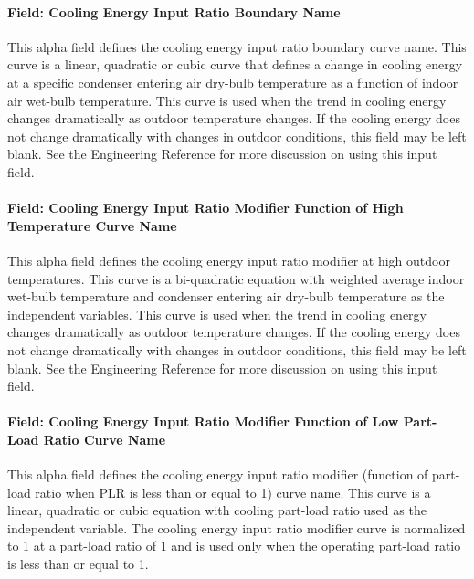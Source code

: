 \paragraph{Field: Cooling Energy Input Ratio Boundary Name}\label{field-cooling-energy-input-ratio-boundary-name}

This alpha field defines the cooling energy input ratio boundary curve name. This curve is a linear, quadratic or cubic curve that defines a change in cooling energy at a specific condenser entering air dry-bulb temperature as a function of indoor air wet-bulb temperature. This curve is used when the trend in cooling energy changes dramatically as outdoor temperature changes. If the cooling energy does not change dramatically with changes in outdoor conditions, this field may be left blank. See the Engineering Reference for more discussion on using this input field.

\paragraph{Field: Cooling Energy Input Ratio Modifier Function of High Temperature Curve Name}\label{field-cooling-energy-input-ratio-modifier-function-of-high-temperature-curve-name}

This alpha field defines the cooling energy input ratio modifier at high outdoor temperatures. This curve is a bi-quadratic equation with weighted average indoor wet-bulb temperature and condenser entering air dry-bulb temperature as the independent variables. This curve is used when the trend in cooling energy changes dramatically as outdoor temperature changes. If the cooling energy does not change dramatically with changes in outdoor conditions, this field may be left blank. See the Engineering Reference for more discussion on using this input field.

\paragraph{Field: Cooling Energy Input Ratio Modifier Function of Low Part-Load Ratio Curve Name}\label{field-cooling-energy-input-ratio-modifier-function-of-low-part-load-ratio-curve-name}

This alpha field defines the cooling energy input ratio modifier (function of part-load ratio when PLR is less than or equal to 1) curve name. This curve is a linear, quadratic or cubic equation with cooling part-load ratio used as the independent variable. The cooling energy input ratio modifier curve is normalized to 1 at a part-load ratio of 1 and is used only when the operating part-load ratio is less than or equal to 1.

